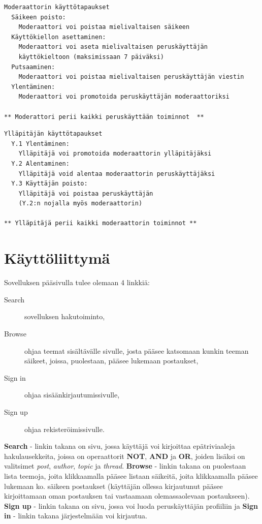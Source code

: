 \documentclass[10pt]{article}
\begin{document}
\newpage

\begin{Verbatim}[frame=single]
Moderaattorin käyttötapaukset
  Säikeen poisto:
    Moderaattori voi poistaa mielivaltaisen säikeen
  Käyttökiellon asettaminen:
    Moderaattori voi aseta mielivaltaisen peruskäyttäjän 
    käyttökieltoon (maksimissaan 7 päiväksi)
  Putsaaminen:
    Moderaattori voi poistaa mielivaltaisen peruskäyttäjän viestin
  Ylentäminen:
    Moderaattori voi promotoida peruskäyttäjän moderaattoriksi
    
** Moderattori perii kaikki peruskäyttään toiminnot  **
\end{Verbatim}

\begin{Verbatim}[frame=single]
Ylläpitäjän käyttötapaukset
  Y.1 Ylentäminen:
    Ylläpitäjä voi promotoida moderaattorin ylläpitäjäksi
  Y.2 Alentaminen:
    Ylläpitäjä void alentaa moderaattorin peruskäyttäjäksi
  Y.3 Käyttäjän poisto:
    Ylläpitäjä voi poistaa peruskäyttäjän
    (Y.2:n nojalla myös moderaattorin)
    
** Ylläpitäjä perii kaikki moderaattorin toiminnot **
\end{Verbatim}

\section{Käyttöliittymä}
Sovelluksen pääsivulla tulee olemaan 4 linkkiä:
\begin{description}
  \item[Search] sovelluksen hakutoiminto,
  \item[Browse] ohjaa teemat sisältävälle sivulle, josta pääsee katsomaan kunkin teeman säikeet, joissa, puolestaan, pääsee lukemaan postaukset,
  \item[Sign in] ohjaa sisäänkirjautumissivulle,
  \item[Sign up] ohjaa rekisteröimissivulle.
\end{description}
\textbf{Search} - linkin takana on sivu, jossa käyttäjä voi kirjoittaa epätriviaaleja hakulausekkeita, joissa on operaattorit \textbf{NOT}, \textbf{AND} ja \textbf{OR}, joiden lisäksi on valitsimet \textit{post}, \textit{author}, \textit{topic} ja \textit{thread}. \textbf{Browse} - linkin takana on puolestaan lista teemoja, joita klikkaamalla pääsee listaan säikeitä, joita klikkaamalla pääsee lukemaan ko. säikeen postaukset (käyttäjän ollessa kirjautunut pääsee kirjoittamaan oman postauksen tai vastaamaan olemassaolevaan postaukseen). \textbf{Sign up} - linkin takana on sivu, jossa voi luoda peruskäyttäjän profiiliin ja \textbf{Sign in} - linkin takana järjestelmään voi kirjautua.
\end{document}
